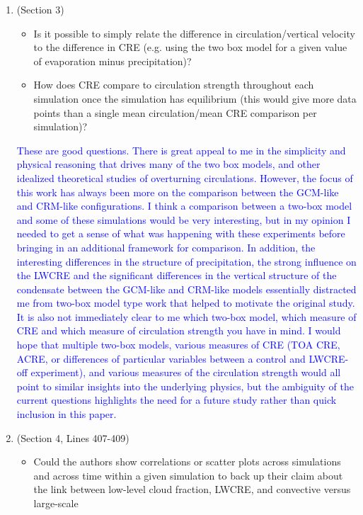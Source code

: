 \documentclass[draft]{agujournal2019}
\begin{document}
\begin{enumerate}
  \item (Section 3)
    \begin{itemize}
      \item Is it possible to simply relate the difference in circulation/vertical velocity to the difference in CRE (e.g. using the
two box model for a given value of evaporation minus precipitation)?
      \item How does CRE compare to circulation strength throughout each simulation once the simulation has equilibrium
(this would give more data points than a single mean circulation/mean CRE comparison per simulation)?
    \end{itemize}
  \textcolor{blue}{These are good questions.  There is great appeal to me in the simplicity and physical reasoning that drives many of the two box models, and other idealized
  theoretical studies of overturning circulations.  However, the focus of this work has always been more on the comparison between the
  GCM-like and CRM-like configurations.  I think a comparison between a two-box model and some of these simulations would be 
  very interesting, but in my opinion I needed to get a sense of what was happening with these experiments before bringing in an 
  additional framework for comparison.  In addition, the interesting differences in the structure of precipitation, the strong influence
  on the LWCRE and the significant differences in the vertical structure of the condensate between the GCM-like and CRM-like 
  models essentially distracted me from two-box model type work that helped to motivate the original study.  It is also not immediately clear to me which two-box model, which measure of CRE and which measure of circulation strength you have in mind.  I would hope
  that multiple two-box models, various measures of CRE (TOA CRE, ACRE, or differences of particular variables between a control and LWCRE-off experiment), and various measures of the circulation strength would all point to similar insights into the underlying physics, but the ambiguity of the current questions highlights the need for a future study rather than quick inclusion in this paper.}  
  \item (Section 4, Lines 407-409)
    \begin{itemize}
      \item Could the authors show correlations or scatter plots across simulations and across time within a given simulation
to back up their claim about the link between low-level cloud fraction, LWCRE, and convective versus large-scale

\end{itemize}
\end{enumerate}
\end{document}
